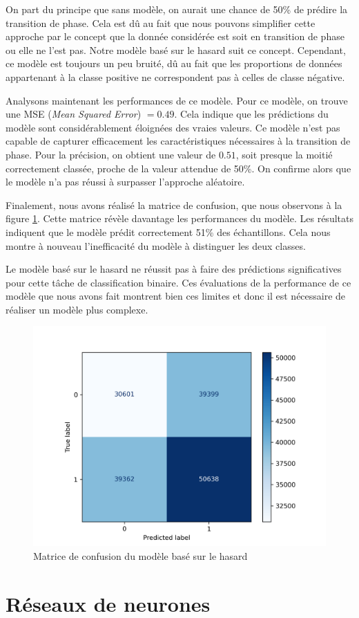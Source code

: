 \documentclass[11pt, parskip=half]{scrartcl} %
\begin{document}
On part du principe que sans modèle, on aurait une chance de 50\% de prédire la transition de phase. Cela est dû au fait que nous pouvons simplifier cette approche par le concept que la donnée considérée est soit en transition de phase ou elle ne l’est pas. Notre modèle basé sur le hasard suit ce concept. Cependant, ce modèle est toujours un peu bruité, dû au fait que les proportions de données appartenant à la classe positive ne correspondent pas à celles de classe négative.

Analysons maintenant les performances de ce modèle. Pour ce modèle, on trouve une MSE (\textit{Mean Squared Error}) $= 0.49$. Cela indique que les prédictions du modèle sont considérablement éloignées des vraies valeurs. Ce modèle n’est pas capable de capturer efficacement les caractéristiques nécessaires à la transition de phase. Pour la précision, on obtient une valeur de $0.51$, soit presque la moitié correctement classée, proche de la valeur attendue de 50\%. On confirme alors que le modèle n’a pas réussi à surpasser l’approche aléatoire. 

Finalement, nous avons réalisé la matrice de confusion, que nous observons à la figure \ref{fig:random_matrix}. Cette matrice révèle davantage les performances du modèle. Les résultats indiquent que le modèle prédit correctement 51\% des échantillons. Cela nous montre à nouveau l’inefficacité du modèle à distinguer les deux classes. 

Le modèle basé sur le hasard ne réussit pas à faire des prédictions significatives pour cette tâche de classification binaire. Ces évaluations de la performance de ce modèle que nous avons fait montrent bien ces limites et donc il est nécessaire de réaliser un modèle plus complexe.

\begin{figure}[h]
	\centering
	\includegraphics[width=0.44\linewidth]{./figures/random_matrix.png}
	\caption{Matrice de confusion du modèle basé sur le hasard}
	\label{fig:random_matrix}
\end{figure}

\newpage
\section{Réseaux de neurones}
\end{document}
